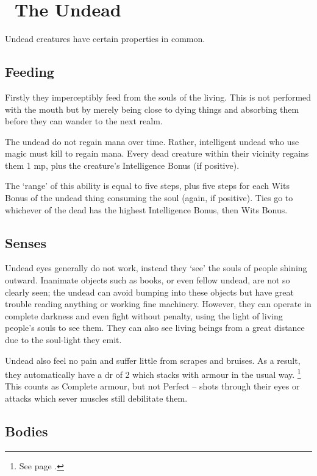 \section[The Undead]{\D~The Undead}
\label{undead}

\begin{multicols}{2}

\noindent
Undead creatures have certain properties in common.

\subsection{Feeding}
Firstly they imperceptibly feed from the souls of the living.
This is not performed with the mouth but by merely being close to dying things and absorbing them before they can wander to the next realm.

The undead do not regain mana over time.
Rather, intelligent undead who use magic must kill to regain mana.
Every dead creature within their vicinity regains them 1 \gls{mp}, plus the creature's Intelligence Bonus (if positive).

The `range' of this ability is equal to five steps, plus five steps for each Wits Bonus of the undead thing consuming the soul (again, if positive).
Ties go to whichever of the dead has the highest Intelligence Bonus, then Wits Bonus.

\subsection{Senses}

Undead eyes generally do not work, instead they `see' the souls of people shining outward.
Inanimate objects such as books, or even fellow undead, are not so clearly seen; the undead can avoid bumping into these objects but have great trouble reading anything or working fine machinery.
However, they can operate in complete darkness and even fight without penalty, using the light of living people's souls to see them.
They can also see living beings from a great distance due to the soul-light they emit.

Undead also feel no pain and suffer little from scrapes and bruises.
As a result, they automatically have a \gls{dr} of 2 which stacks with armour in the usual way.%
\footnote{See page \pageref{stackingarmour}.}
This counts as Complete armour, but not Perfect -- shots through their eyes or attacks which sever muscles still debilitate them.

\subsection{Bodies}


\end{multicols}

